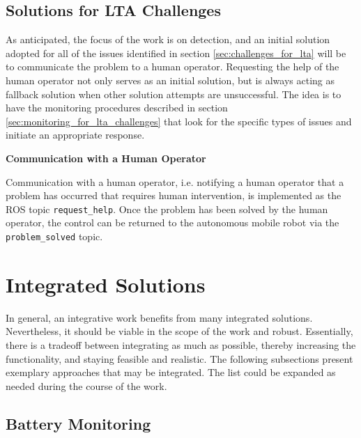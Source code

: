 \documentclass[english, master, utf8]{base/thesis_KBS}
\newcommand{\code}[1]{\colorbox{light-gray}{\texttt{#1}}}
\begin{document}
\section{Solutions for LTA Challenges}
\label{sec:solutions_for_lta_challenges}

As anticipated, the focus of the work is on detection, and an initial solution adopted for all of the issues identified in section \ref{sec:challenges_for_lta} will be 
to communicate the problem to a human operator. Requesting the help of the human operator not only serves as an initial solution, but is always acting as fallback 
solution when other solution attempts are unsuccessful. The idea is to have the monitoring procedures described in section \ref{sec:monitoring_for_lta_challenges} that 
look for the specific types of issues and initiate an appropriate response.\newline

\noindent
\textbf{Communication with a Human Operator}\newline

\noindent
Communication with a human operator, i.e. notifying a human operator that a problem has occurred that requires human intervention, 
is implemented as the ROS topic \code{\/request\_help}. Once the problem has been solved by the human operator, the control can be returned 
to the autonomous mobile robot via the \code{\/problem\_solved} topic.\newline

\chapter{Integrated Solutions}

In general, an integrative work benefits from many integrated solutions. Nevertheless, it should be viable in the scope of the work and robust.
Essentially, there is a tradeoff between integrating as much as possible, thereby increasing the functionality, and staying feasible and realistic.
The following subsections present exemplary approaches that may be integrated. The list could be expanded as needed during the course of the work.

\section{Battery Monitoring}
\label{sec:battery_monitoring}
\end{document}
